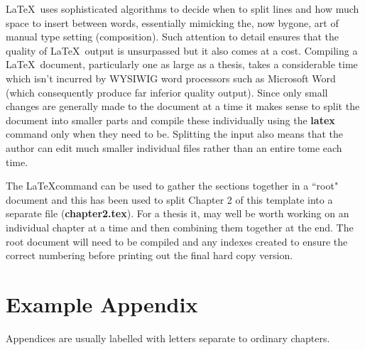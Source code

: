 \documentclass[11pt,oneside]{book}
\begin{document}
\LaTeX \ uses sophisticated algorithms to decide when to split lines
and how much space to insert between words, essentially mimicking the, now
bygone, art of manual type setting (composition). Such attention
to detail ensures that the quality of \LaTeX \ output is unsurpassed but it
also comes at a cost. Compiling a \LaTeX \ document, particularly one as large
as a thesis, takes a considerable time which isn't incurred by WYSIWIG
word processors such as Microsoft Word (which consequently produce far inferior
quality output). Since only small changes are generally made to the document
at a time it makes sense to split the document into smaller parts and compile
these individually using the {\bf latex} command only when they need to be.
Splitting the input also means
that the author can edit much smaller individual files rather than
an entire tome each time.

The \LaTeX command
\verb++ can be used to gather the sections together in a ``root"
document and this has been used to split Chapter 2 of this template into
a separate file ({\bf chapter2.tex}).  For a thesis it, may
well be worth working on an individual chapter at a time and then combining
them together at the end. The root document will need to be compiled
and any indexes created to ensure the correct numbering before printing
out the final hard copy version.

% 


\appendix
\chapter{Example Appendix}
Appendices are usually labelled with letters separate to ordinary chapters.





\printindex
{}

\begin{verbatim}










\end{verbatim}
\end{document}
